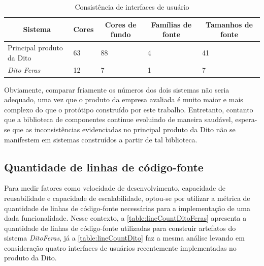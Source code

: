 \begin{table}
  \centering
  \begin{tabular}{|m{3cm}|m{1cm}|m{1cm}|m{1cm}|m{1cm}|} \hline
    
    \multicolumn{1}{|c|}{\bfseries Sistema} & \multicolumn{1}{c|}{\bfseries Cores} & \multicolumn{1}{c|}{\bfseries Cores de fundo} & \multicolumn{1}{c|}{\bfseries Famílias de fonte} & \multicolumn{1}{c|}{\bfseries Tamanhos de fonte} \\\hline
    
    Principal produto da Dito & 63 & 88 & 4 & 41 \\\hline
    \textit{Dito Feras} & 12 & 7 & 1 & 7 \\\hline
      
  \end{tabular}
  \caption{Consistência de interfaces de usuário}
  \label{table:interfaceConsistence}
\end{table}

Obviamente, comparar friamente os números dos dois sistemas não seria adequado, uma vez que o produto da empresa avaliada é muito maior e mais complexo do que o protótipo construído por este trabalho. Entretanto, contanto que a biblioteca de componentes continue evoluindo de maneira saudável, espera-se que as inconsistências evidenciadas no principal produto da Dito não se manifestem em sistemas construídos a partir de tal biblioteca.

\subsection{Quantidade de linhas de código-fonte}

Para medir fatores como velocidade de desenvolvimento, capacidade de reusabilidade e capacidade de escalabilidade, optou-se por utilizar a métrica de quantidade de linhas de código-fonte necessárias para a implementação de uma dada funcionalidade. Nesse contexto, a \autoref{table:lineCountDitoFeras} apresenta a quantidade de linhas de código-fonte utilizadas para construir artefatos do sistema \textit{DitoFeras}, já a \autoref{table:lineCountDito} faz a mesma análise levando em consideração quatro interfaces de usuários recentemente implementadas no produto da Dito.

